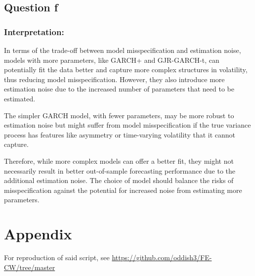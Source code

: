 \documentclass{article}
\begin{document}
\subsection*{Question f}
\subsubsection*{Interpretation:}

In terms of the trade-off between model misspecification and estimation noise, models with more parameters, like GARCH+ and GJR-GARCH-t, can potentially fit the data better and capture more complex structures in volatility, thus reducing model misspecification. However, they also introduce more estimation noise due to the increased number of parameters that need to be estimated.

The simpler GARCH model, with fewer parameters, may be more robust to estimation noise but might suffer from model misspecification if the true variance process has features like asymmetry or time-varying volatility that it cannot capture.

Therefore, while more complex models can offer a better fit, they might not necessarily result in better out-of-sample forecasting performance due to the additional estimation noise. The choice of model should balance the risks of misspecification against the potential for increased noise from estimating more parameters.

\newpage
\section*{Appendix}

For reproduction of said script, see \url{https://github.com/oddish3/FE-CW/tree/master}


\end{document}
